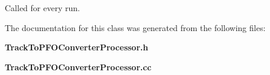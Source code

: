 Called for every run. 



The documentation for this class was generated from the following files\+:\begin{DoxyCompactItemize}
\item 
\textbf{ Track\+To\+P\+F\+O\+Converter\+Processor.\+h}\item 
\textbf{ Track\+To\+P\+F\+O\+Converter\+Processor.\+cc}\end{DoxyCompactItemize}
